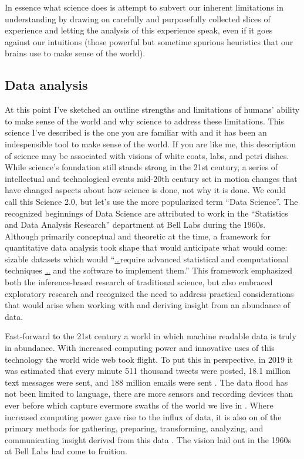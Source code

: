 \documentclass[
]{article}
\begin{document}
In essence what science does is attempt to subvert our inherent limitations in understanding by drawing on carefully and purposefully collected slices of experience and letting the analysis of this experience speak, even if it goes against our intuitions (those powerful but sometime spurious heuristics that our brains use to make sense of the world).

\hypertarget{data-analysis}{%
\subsection{Data analysis}\label{data-analysis}}

At this point I've sketched an outline strengths and limitations of humans' ability to make sense of the world and why science to address these limitations. This science I've described is the one you are familiar with and it has been an indespensible tool to make sense of the world. If you are like me, this description of science may be associated with visions of white coats, labs, and petri dishes. While science's foundation still stands strong in the 21st century, a series of intellectual and technological events mid-20th century set in motion changes that have changed aspects about how science is done, not why it is done. We could call this Science 2.0, but let's use the more popularized term ``Data Science''. The recognized beginnings of Data Science are attributed to work in the ``Statistics and Data Analysis Research'' department at Bell Labs during the 1960s. Although primarily conceptual and theoretic at the time, a framework for quantitative data analysis took shape that would anticipate what would come: sizable datasets which would ``\protect\hyperlink{section-1}{\ldots{}}require advanced statistical and computational techniques \protect\hyperlink{section-1}{\ldots{}} and the software to implement them.'' \citep{Chambers2020} This framework emphasized both the inference-based research of traditional science, but also embraced exploratory research and recognized the need to address practical considerations that would arise when working with and deriving insight from an abundance of data.

Fast-forward to the 21st century a world in which machine readable data is truly in abundance. With increased computing power and innovative uses of this technology the world wide web took flight. To put this in perspective, in 2019 it was estimated that every minute 511 thousand tweets were posted, 18.1 million text messages were sent, and 188 million emails were sent \citep{DataNeverSleeps08-2021}. The data flood has not been limited to language, there are more sensors and recording devices than ever before which capture evermore swaths of the world we live in \citep{Desjardins2019}. Where increased computing power gave rise to the influx of data, it is also on of the primary methods for gathering, preparing, transforming, analyzing, and communicating insight derived from this data \citep{Donoho2017}. The vision laid out in the 1960s at Bell Labs had come to fruition.
\end{document}
